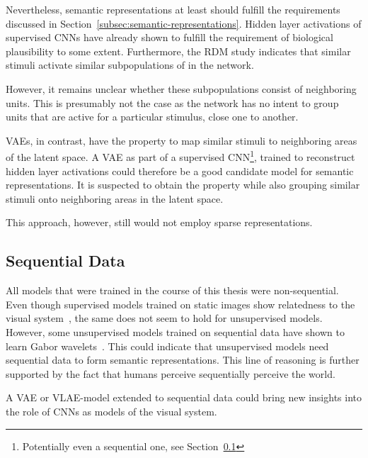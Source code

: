 Nevertheless, semantic representations at least should fulfill the requirements discussed in Section~\ref{subsec:semantic-representations}.
Hidden layer activations of supervised \acp{CNN} have already shown to fulfill the requirement of biological plausibility to some extent.
Furthermore, the \ac{RDM} study indicates that similar stimuli activate similar subpopulations of  in the network.

However, it remains unclear whether these subpopulations consist of neighboring units.
This is presumably not the case as the network has no intent to group units that are active for a particular stimulus, close one to another.

\acfp{VAE}, in contrast, have the property to map similar stimuli to neighboring areas of the latent space.
A \ac{VAE} as part of a supervised \ac{CNN}\footnote{Potentially even a sequential one, see Section~\ref{subsec:sequential-data}}, trained to reconstruct hidden layer activations could therefore be a good candidate model for semantic representations.
It is suspected to obtain the  property while also grouping similar stimuli onto neighboring areas in the latent space.

This approach, however, still would not employ sparse representations.

\subsection{Sequential Data}\label{subsec:sequential-data}

All models that were trained in the course of this thesis were non-sequential.
Even though supervised models trained on static images show relatedness to the visual system~\citep{khaligh2014deep,cadieu2014deep,krizhevsky2012imagenet}, the same does not seem to hold for unsupervised models.
However, some unsupervised models trained on sequential data have shown to learn Gabor wavelets~\citep{berkes2005slow,palm2012prediction}.
This could indicate that unsupervised models need sequential data to form semantic representations.
This line of reasoning is further supported by the fact that humans perceive sequentially perceive the world.

A \ac{VAE} or \ac{VLAE}-model extended to sequential data could bring new insights into the role of \acp{CNN} as models of the visual system.